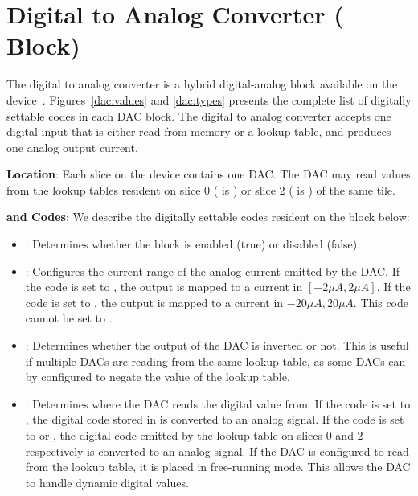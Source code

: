 \chapter{Digital to Analog Converter ( Block)}

The digital to analog converter is a hybrid digital-analog block available on
the \hcdc device~\cite{dac.h}. Figures~\ref{dac:values} and \ref{dac:types}
presents the complete list of digitally settable codes in each DAC block. The
digital to analog converter accepts one digital input that is either read from
memory or a lookup table, and produces one analog output current. 

\noindent\textbf{Location}: Each slice on the \hcdc device contains one
DAC. The DAC may read values from the lookup tables resident on slice 0 
( is ) or slice 2 ( is )
of the same tile.

\noindent\textbf{\static and \dynamic Codes}: We describe the digitally settable
codes resident on the block below:

\begin{itemize}
\item{}: Determines whether the block is enabled (true) or disabled
  (false).
\item{}: Configures the current range of the analog current emitted by
  the DAC. If the code is set to , the output is mapped to a
  current in $[-2 \mu A, 2 \mu A]$. If the code is set to , the
  output is mapped to a current in $-20 \mu A, 20 \mu A$. This code cannot be
  set to .
  \item{}: Determines whether the output of the DAC is inverted or not.
    This is useful if multiple DACs are reading from the same lookup table, as
    some DACs can by configured to negate the value of the lookup table.
  \item{}: Determines where the DAC reads the digital value from. If
    the code is set to , the digital code stored in 
    is converted to an analog signal. If the code is set to  or
    , the digital code emitted by the lookup table on slices 0 and
    2 respectively is converted to an analog signal. If the DAC is configured to
    read from the lookup table, it is placed in free-running mode. This allows
    the DAC to handle dynamic digital values.  
\end{itemize}

